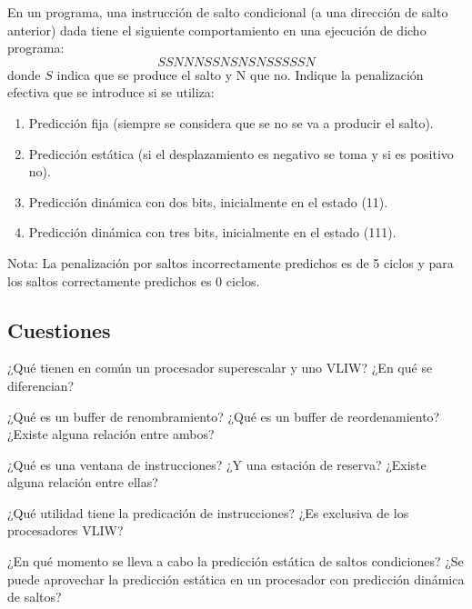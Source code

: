 \begin{ejercicio}
En un programa, una instrucción de salto condicional (a una dirección de salto anterior) dada tiene el siguiente comportamiento en una ejecución de dicho programa:    
\begin{equation*}
    SSNNNSSNSNSNSSSSSN
\end{equation*}
donde $S$ indica que se produce el salto y N que no. Indique la penalización efectiva que se introduce si se utiliza:
\begin{enumerate}
    \item Predicción fija (siempre se considera que se no se va a producir el salto).
    \item Predicción estática (si el desplazamiento es negativo se toma y si es positivo no).
    \item Predicción dinámica con dos bits, inicialmente en el estado (11).
    \item Predicción dinámica con tres bits, inicialmente en el estado (111).
\end{enumerate}
Nota: La penalización por saltos incorrectamente predichos es de 5 ciclos y para los saltos correctamente predichos es 0 ciclos.
\end{ejercicio}

\subsection{Cuestiones}

\begin{cuestion}
¿Qué tienen en común un procesador superescalar y uno VLIW? ¿En qué se diferencian?
\end{cuestion}

\begin{cuestion}
   ¿Qué es un buffer de renombramiento? ¿Qué es un buffer de reordenamiento? ¿Existe alguna relación entre ambos? 
\end{cuestion}

\begin{cuestion}
   ¿Qué es una ventana de instrucciones? ¿Y una estación de reserva? ¿Existe alguna relación entre ellas? 
\end{cuestion}

\begin{cuestion}
    ¿Qué utilidad tiene la predicación de instrucciones? ¿Es exclusiva de los procesadores VLIW?
\end{cuestion}

\begin{cuestion}
¿En qué momento se lleva a cabo la predicción estática de saltos condiciones? ¿Se puede aprovechar la predicción estática en un procesador con predicción dinámica de saltos?
\end{cuestion}

